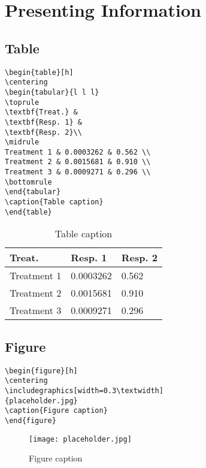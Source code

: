 \chapter{Presenting Information}

\lipsum[1] 
\section{Table}
\lipsum[1] 
\lipsum[1][1-3]
\begin{highlightbox}
\begin{verbatim}
\begin{table}[h]
\centering
\begin{tabular}{l l l}
\toprule
\textbf{Treat.} & 
\textbf{Resp. 1} & 
\textbf{Resp. 2}\\
\midrule
Treatment 1 & 0.0003262 & 0.562 \\
Treatment 2 & 0.0015681 & 0.910 \\
Treatment 3 & 0.0009271 & 0.296 \\
\bottomrule
\end{tabular}
\caption{Table caption}
\end{table}
\end{verbatim}
\end{highlightbox}
\begin{table}[h]
\centering
\begin{tabular}{l l l}
\toprule
\textbf{Treat.} & \textbf{Resp. 1} & \textbf{Resp. 2}\\
\midrule
Treatment 1 & 0.0003262 & 0.562 \\
Treatment 2 & 0.0015681 & 0.910 \\
Treatment 3 & 0.0009271 & 0.296 \\
\bottomrule
\end{tabular}
\caption{Table caption}
\end{table}

\section{Figure}

\lipsum[1] 

\begin{highlightbox}
\begin{verbatim}
\begin{figure}[h]
\centering
\includegraphics[width=0.3\textwidth]
{placeholder.jpg}
\caption{Figure caption}
\end{figure}
\end{verbatim}
\end{highlightbox}
\begin{figure}[h]
\centering\texttt{[image: placeholder.jpg]}
\caption{Figure caption}
\end{figure}

